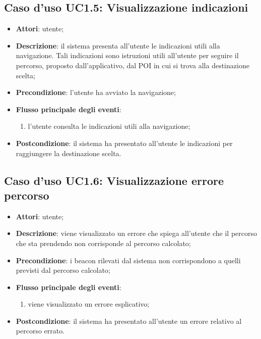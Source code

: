 \documentclass[../AnalisiDeiRequisiti.tex]{subfiles}
\begin{document}
\subsection{Caso d'uso UC1.5: Visualizzazione indicazioni}
\begin{itemize}
	\item \textbf{Attori}: utente;
	\item \textbf{Descrizione}: il sistema presenta all'utente le indicazioni utili alla navigazione. Tali indicazioni sono istruzioni utili all'utente per seguire il percorso, proposto dall'applicativo, dal POI in cui si trova alla destinazione scelta; 
	\item \textbf{Precondizione}: l'utente ha avviato la navigazione;
	
	\item \textbf{Flusso principale degli eventi}:
	\begin{enumerate}
		\item l'utente consulta le indicazioni utili alla navigazione;
		
	\end{enumerate}
	\item \textbf{Postcondizione}: il sistema ha presentato all'utente le indicazioni per raggiungere la destinazione scelta.
\end{itemize}
\hypertarget{UC1.6}{}
\subsection{Caso d'uso UC1.6: Visualizzazione errore percorso}
\begin{itemize}
	\item \textbf{Attori}: utente;
	\item \textbf{Descrizione}: viene visualizzato un errore che spiega all'utente che il percorso che sta prendendo non corrisponde al percorso calcolato; 
	\item \textbf{Precondizione}: i beacon rilevati dal sistema non corrispondono a quelli previsti dal percorso calcolato;
	
	\item \textbf{Flusso principale degli eventi}:
	\begin{enumerate}
		\item viene visualizzato un errore esplicativo;
		
	\end{enumerate}
	\item \textbf{Postcondizione}: il sistema ha presentato all'utente un errore relativo al percorso errato.
\end{itemize}
\hypertarget{UC1.7}{}
\end{document}
